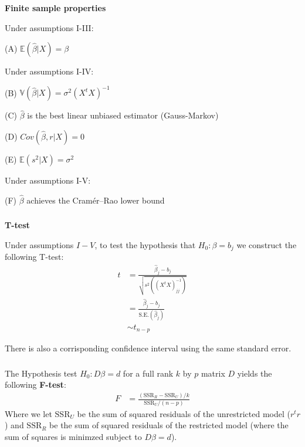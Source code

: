 \begin{frame}[fragile] \frametitle{}

{\bf Finite sample properties}

Under assumptions I-III:

\hspace{1cm} (A) $\mathbb{E} (\widehat{\beta} | X) = \beta$

Under assumptions I-IV:

\hspace{1cm}  (B)  $\mathbb{V} (\widehat{\beta} | X) = \sigma^2 (X^t X)^{-1}$

\hspace{1cm}  (C) $\widehat{\beta}$ is the best linear unbiased estimator (Gauss-Markov)

\hspace{1cm}  (D) $Cov( \widehat{\beta}, r | X) = 0$

\hspace{1cm}  (E) $\mathbb{E} (s^2 | X) = \sigma^2$

Under assumptions I-V:

\hspace{1cm}  (F) $\widehat{\beta}$ achieves the Cramér–Rao lower bound

\end{frame}

\begin{frame}[fragile] \frametitle{}

{\bf T-test}

Under assumptions $I-V$, to test the hypothesis that $H_0: \beta = b_j$
we construct the following T-test:
\begin{align*}
t &= \frac{\widehat{\beta}_j - b_j}{\sqrt{s^2  \left( (X^t X)^{-1}_{jj} \right)}} \\
&= \frac{\widehat{\beta}_j - b_j}{\text{S.E.}(\widehat{\beta}_j)} \\
&\sim t_{n-p}
\end{align*}

There is also a corrisponding confidence interval using the same standard
error.

\end{frame}

\begin{frame}[fragile] \frametitle{}

The Hypothesis test $H_0: D\beta = d$ for a full rank $k$ by $p$ matrix
$D$ yields the following {\bf F-test}:
\begin{align*}
F &= \frac{(\text{SSR}_R -  \text{SSR}_U) / k }{\text{SSR}_U / (n - p)}
\end{align*}
Where we let $\text{SSR}_U$ be the sum of squared residuals of the unrestricted
model ($r^t r$) and $\text{SSR}_R$ be the sum of squared residuals of the
restricted model (where the sum of squares is minimzed subject
to $D\beta = d$).

\end{frame}

